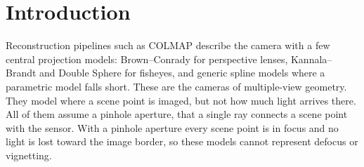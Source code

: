 \section{Introduction}
\label{sec:introduction}
Reconstruction pipelines such as COLMAP \cite{schoenberger2016sfm}
describe the camera with a few central projection models:
Brown--Conrady \cite{Brown1966DecenteringDO} for perspective lenses,
Kannala--Brandt \cite{kannala-brandt} and Double Sphere
\cite{double-sphere} for fisheyes, and generic spline models
\cite{10000params,spline-camera} where a parametric model falls short.
These are the cameras of multiple-view geometry. They model where a
scene point is imaged, but not how much light arrives there. All of
them assume a pinhole aperture, \ie that a single ray connects a scene
point with the sensor. With a pinhole aperture every scene point is in
focus and no light is lost toward the image border, so these models
cannot represent defocus or vignetting.

\suppressfloats[t]%
\begin{figure}[t]
        \centering
        
        \caption{\protect}
        \label{fig:teaser}
\end{figure}

